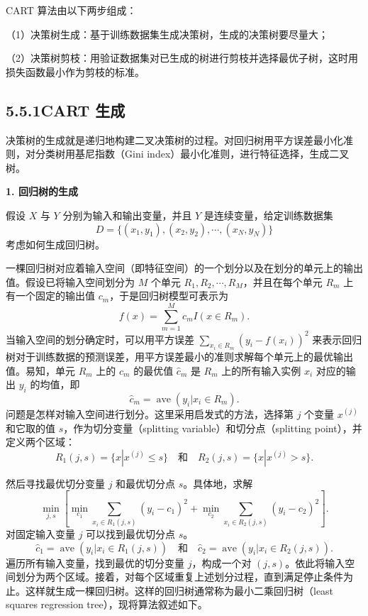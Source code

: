 \documentclass[UTF8, 12pt, fontset=fandol, oneside]{ctexart}
\begin{document}
CART 算法由以下两步组成：

（1）决策树生成：基于训练数据集生成决策树，生成的决策树要尽量大；

（2）决策树剪枝：用验证数据集对已生成的树进行剪枝并选择最优子树，这时用损失函数最小作为剪枝的标准。

\subsection*{5.5.1\quad CART 生成}

决策树的生成就是递归地构建二叉决策树的过程。对回归树用平方误差最小化准则，对分类树用基尼指数（Gini index）最小化准则，进行特征选择，生成二叉树。

\noindent\textbf{1. 回归树的生成}

假设 $X$ 与 $Y$ 分别为输入和输出变量，并且 $Y$ 是连续变量，给定训练数据集
\[
  D=\{(x_1,y_1),(x_2,y_2),\cdots,(x_N,y_N)\}
\]
考虑如何生成回归树。

一棵回归树对应着输入空间（即特征空间）的一个划分以及在划分的单元上的输出值。假设已将输入空间划分为 $M$ 个单元 $R_1,R_2,\cdots,R_M$，并且在每个单元 $R_m$ 上有一个固定的输出值 $c_m$，于是回归树模型可表示为
\begin{equation}
  f(x)=\sum_{m=1}^{M}c_mI(x\in R_m).
  \tag{5.16}
\end{equation}
当输入空间的划分确定时，可以用平方误差 $\sum_{x_i\in R_m}(y_i-f(x_i))^2$ 来表示回归树对于训练数据的预测误差，用平方误差最小的准则求解每个单元上的最优输出值。易知，单元 $R_m$ 上的 $c_m$ 的最优值 $\hat c_m$ 是 $R_m$ 上的所有输入实例 $x_i$ 对应的输出 $y_i$ 的均值，即
\begin{equation}
  \hat c_m=\operatorname{ave}(y_i|x_i\in R_m).
  \tag{5.17}
\end{equation}
问题是怎样对输入空间进行划分。这里采用启发式的方法，选择第 $j$ 个变量 $x^{(j)}$ 和它取的值 $s$，作为切分变量（splitting variable）和切分点（splitting point），并定义两个区域：
\begin{equation}
  R_1(j,s)=\{x|x^{(j)}\le s\}\quad\text{和}\quad R_2(j,s)=\{x|x^{(j)}>s\}.
  \tag{5.18}
\end{equation}

然后寻找最优切分变量 $j$ 和最优切分点 $s$。具体地，求解
\begin{equation}
  \min_{j,s}\left[
  \min_{c_1}\sum_{x_i\in R_1(j,s)}(y_i-c_1)^2+
  \min_{c_2}\sum_{x_i\in R_2(j,s)}(y_i-c_2)^2
  \right].
  \tag{5.19}
\end{equation}
对固定输入变量 $j$ 可以找到最优切分点 $s$。
\begin{equation}
  \hat c_1=\operatorname{ave}(y_i|x_i\in R_1(j,s))\quad\text{和}\quad
  \hat c_2=\operatorname{ave}(y_i|x_i\in R_2(j,s)).
  \tag{5.20}
\end{equation}
遍历所有输入变量，找到最优的切分变量 $j$，构成一个对 $(j,s)$。依此将输入空间划分为两个区域。接着，对每个区域重复上述划分过程，直到满足停止条件为止。这样就生成一棵回归树。这样的回归树通常称为最小二乘回归树（least squares regression tree），现将算法叙述如下。
\end{document}
